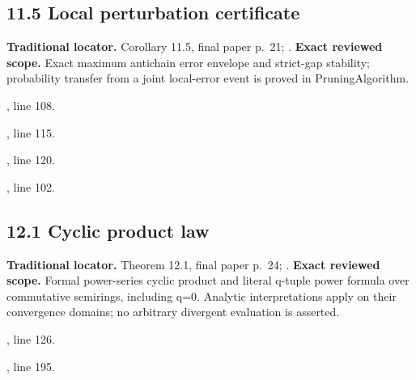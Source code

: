 \subsection{11.5 Local perturbation certificate}
\label{result:11.5}
\textbf{Traditional locator.} Corollary 11.5, final paper p.~21; .
\textbf{Exact reviewed scope.} Exact maximum antichain error envelope and strict-gap stability; probability transfer from a joint local-error event is proved in PruningAlgorithm.
{\small{}\par}
{\footnotesize\color{muted}, line 108.\par}\smallskip
{\small{}\par}
{\footnotesize\color{muted}, line 115.\par}\smallskip
{\small{}\par}
{\footnotesize\color{muted}, line 120.\par}\smallskip
{\small{}\par}
{\footnotesize\color{muted}, line 102.\par}\smallskip
{}
\subsection{12.1 Cyclic product law}
\label{result:12.1}
\textbf{Traditional locator.} Theorem 12.1, final paper p.~24; .
\textbf{Exact reviewed scope.} Formal power-series cyclic product and literal q-tuple power formula over commutative semirings, including q=0. Analytic interpretations apply on their convergence domains; no arbitrary divergent evaluation is asserted.
{\small{}\par}
{\footnotesize\color{muted}, line 126.\par}\smallskip
{\small{}\par}
{\footnotesize\color{muted}, line 195.\par}\smallskip
{}
